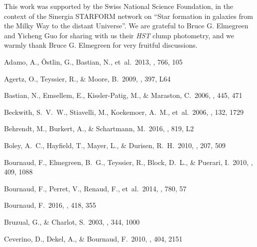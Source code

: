 \documentclass[twocolumn]{aastex61}
\begin{document}
%

\acknowledgments

This work was supported by the Swiss National Science Foundation, in the context 
of the Sinergia STARFORM network on ``Star formation in galaxies from the 
Milky Way to the distant Universe''. We are grateful to Bruce G. Elmegreen and 
Yicheng Guo for sharing with us their {\it HST} clump photometry, and we warmly 
thank Bruce G. Elmegreen for very fruitful discussions.

%

\begin{thebibliography}{}

Adamo, A., \"Ostlin, G., Bastian, N., et~al.\ 2013, \apj, 766, 105

Agertz, O., Teyssier, R., \& Moore, B.\ 2009, \mnras, 397, L64

Bastian, N., Emsellem, E., Kissler-Patig, M., \& Maraston, C.\ 2006, \aap, 445, 471

Beckwith, S.~V.~W., Stiavelli, M., Koekemoer, A.~M., et~al.\ 2006, \aj, 132, 1729

Behrendt, M., Burkert, A., \& Schartmann, M.\ 2016, \apjl, 819, L2

Boley, A.~C., Hayfield, T., Mayer, L., \& Durisen, R.~H.\ 2010, \icarus, 207, 509

Bournaud, F., Elmegreen, B.~G., Teyssier, R., Block, D.~L., \& Puerari, I.\ 2010, \mnras, 409, 1088

Bournaud, F., Perret, V., Renaud, F., et~al.\ 2014, \apj, 780, 57

Bournaud, F.\ 2016, \apss, 418, 355

Bruzual, G., \& Charlot, S.\ 2003, \mnras, 344, 1000


Ceverino, D., Dekel, A., \& Bournaud, F.\ 2010, \mnras, 404, 2151


\end{thebibliography}
\end{document}
